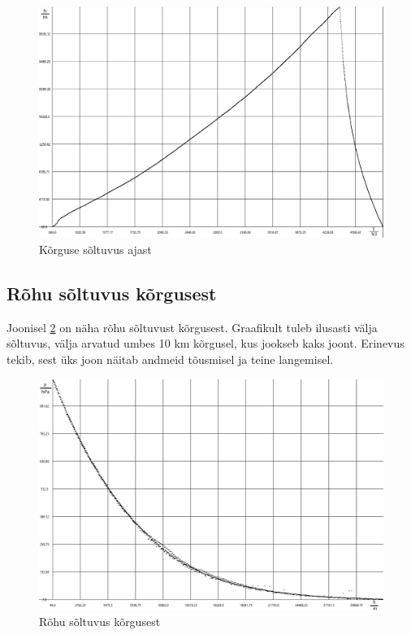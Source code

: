 \documentclass{trkut}%
\begin{document}
\begin{figure}[h]
	\includegraphics[width=1\textwidth]{NK_H_T.png}
	\caption{Kõrguse sõltuvus ajast}
	\label{NK_H_T}%
\end{figure}


\subsection{Rõhu sõltuvus kõrgusest}
Joonisel \ref{NK_R_H} on näha rõhu sõltuvust kõrgusest. Graafikult tuleb ilusasti välja sõltuvus, välja arvatud umbes 10 km kõrgusel, kus jookseb kaks joont. Erinevus tekib, sest üks joon näitab andmeid tõusmisel ja teine langemisel.
\begin{figure}[h]
	\includegraphics[width=1\textwidth]{NK_R_H.png}
	\caption{Rõhu sõltuvus kõrgusest}
	\label{NK_R_H}%
\end{figure}
\end{document}
